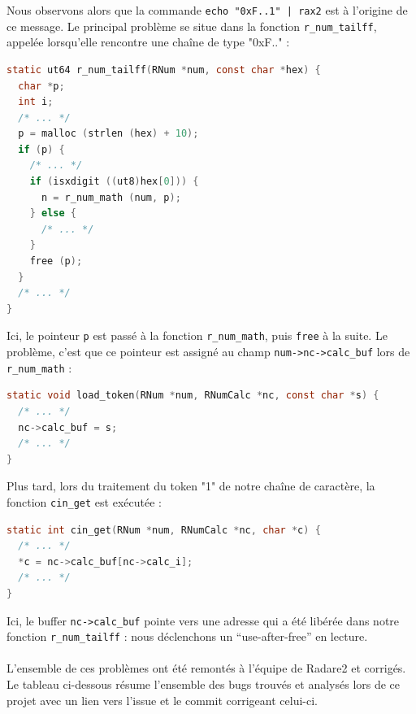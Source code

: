 Nous observons alors que la commande \lstinline{echo "0xF..1" | rax2} est à l'origine de ce message.
Le principal problème se situe dans la fonction \lstinline{r_num_tailff}, appelée lorsqu'elle rencontre une chaîne de type "0xF.." :

\begin{lstlisting}[language=C]
static ut64 r_num_tailff(RNum *num, const char *hex) {
  char *p;
  int i;
  /* ... */
  p = malloc (strlen (hex) + 10);
  if (p) {
    /* ... */
    if (isxdigit ((ut8)hex[0])) {
      n = r_num_math (num, p);
    } else {
      /* ... */
    }
    free (p);
  }
  /* ... */
}
\end{lstlisting}

Ici, le pointeur \lstinline{p} est passé à la fonction \lstinline{r_num_math}, puis \lstinline{free} à la suite.
Le problème, c'est que ce pointeur est assigné au champ \lstinline{num->nc->calc_buf} lors de \lstinline{r_num_math} :

\begin{lstlisting}[language=C]
static void load_token(RNum *num, RNumCalc *nc, const char *s) {
  /* ... */
  nc->calc_buf = s;
  /* ... */
}
\end{lstlisting}

Plus tard, lors du traitement du token "1" de notre chaîne de caractère, la fonction \lstinline{cin_get} est exécutée :

\begin{lstlisting}[language=C]
static int cin_get(RNum *num, RNumCalc *nc, char *c) {
  /* ... */
  *c = nc->calc_buf[nc->calc_i];
  /* ... */
}
\end{lstlisting}

Ici, le buffer \lstinline{nc->calc_buf} pointe vers une adresse qui a été libérée dans notre fonction \lstinline{r_num_tailff} : nous déclenchons un ``use-after-free'' en lecture.

\paragraph{}
L'ensemble de ces problèmes ont été remontés à l'équipe de Radare2 et corrigés.
Le tableau ci-dessous résume l'ensemble des bugs trouvés et analysés lors de ce projet avec un lien vers l'issue et le commit corrigeant celui-ci.

